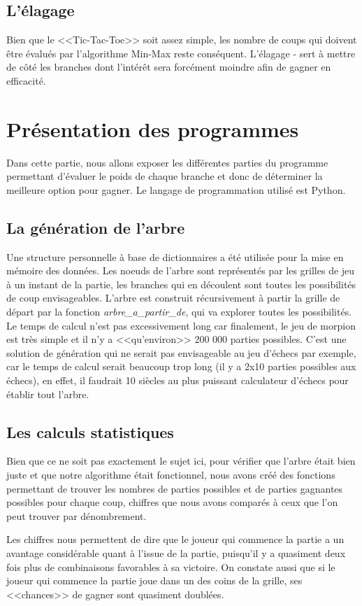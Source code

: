 \documentclass{article}
\begin{document}
\subsection{L'élagage \alpha \beta}

Bien que le <<Tic-Tac-Toe>> soit assez simple, les nombre de coups qui doivent être évalués par l'algorithme Min-Max reste conséquent. L'élagage \alpha{} - \beta{} sert à mettre de côté les branches dont l'intérêt sera forcément moindre afin de gagner en efficacité.

\section{Présentation des programmes}

Dans cette partie, nous allons exposer les différentes parties du programme permettant d'évaluer le poids de chaque branche et donc de déterminer la meilleure option pour gagner. Le langage de programmation utilisé est Python.

\subsection{La génération de l'arbre}

Une structure personnelle à base de dictionnaires a été utilisée pour la mise en mémoire des données. Les noeuds de l'arbre sont représentés par les grilles de jeu à un instant de la partie, les branches qui en découlent sont toutes les possibilités de coup envisageables. L'arbre est construit récursivement à partir la grille de départ par la fonction \emph{arbre\_a\_partir\_de}, qui va explorer toutes les possibilités. Le temps de calcul n'est pas excessivement long car finalement, le jeu de morpion est très simple et il n'y a <<qu'environ>> 200 000 parties possibles. C'est une solution de génération qui ne serait pas envisageable au jeu d'échecs par exemple, car le temps de calcul serait beaucoup trop long (il y a 2x10 parties possibles aux échecs), en effet, il faudrait 10 siècles au plus puissant calculateur d'échecs pour établir tout l'arbre.

\subsection{Les calculs statistiques}

Bien que ce ne soit pas exactement le sujet ici, pour vérifier que l'arbre était bien juste et que notre algorithme était fonctionnel, nous avons créé des fonctions permettant de trouver les nombres de parties possibles et de parties gagnantes possibles pour chaque coup, chiffres que nous avons comparés à ceux que l'on peut trouver par dénombrement.


Les chiffres nous permettent de dire que le joueur qui commence la partie a un avantage considérable quant à l'issue de la partie, puisqu'il y a quasiment deux fois plus de combinaisons favorables à sa victoire. On constate aussi que si le joueur qui commence la partie joue dans un des coins de la grille, ses <<chances>> de gagner sont quasiment doublées.
\end{document}
